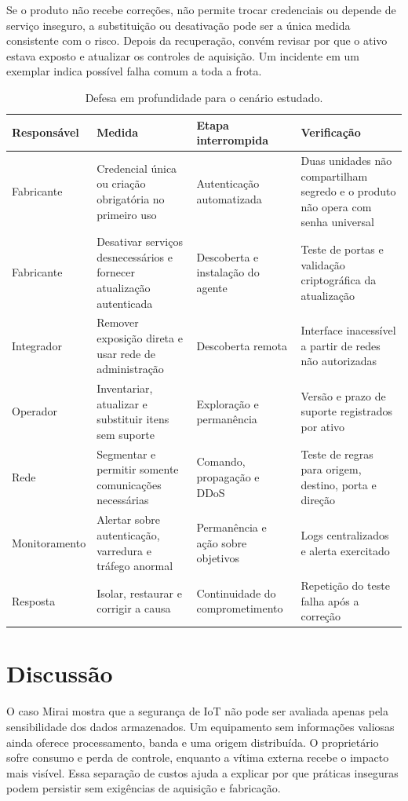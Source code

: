 \documentclass[11pt,a4paper]{article}
\begin{document}
Se o produto não recebe correções, não permite trocar credenciais ou depende de serviço inseguro, a substituição ou desativação pode ser a única medida consistente com o risco. Depois da recuperação, convém revisar por que o ativo estava exposto e atualizar os controles de aquisição. Um incidente em um exemplar indica possível falha comum a toda a frota.

\begin{table}[t]
\centering
\small
\caption{Defesa em profundidade para o cenário estudado.}
\label{tab:medidas}
\begin{tabularx}{\textwidth}{L{2.4cm}L{4.5cm}YY}
\toprule
Responsável & Medida & Etapa interrompida & Verificação \\
\midrule
Fabricante & Credencial única ou criação obrigatória no primeiro uso & Autenticação automatizada & Duas unidades não compartilham segredo e o produto não opera com senha universal \\
Fabricante & Desativar serviços desnecessários e fornecer atualização autenticada & Descoberta e instalação do agente & Teste de portas e validação criptográfica da atualização \\
Integrador & Remover exposição direta e usar rede de administração & Descoberta remota & Interface inacessível a partir de redes não autorizadas \\
Operador & Inventariar, atualizar e substituir itens sem suporte & Exploração e permanência & Versão e prazo de suporte registrados por ativo \\
Rede & Segmentar e permitir somente comunicações necessárias & Comando, propagação e DDoS & Teste de regras para origem, destino, porta e direção \\
Monitoramento & Alertar sobre autenticação, varredura e tráfego anormal & Permanência e ação sobre objetivos & Logs centralizados e alerta exercitado \\
Resposta & Isolar, restaurar e corrigir a causa & Continuidade do comprometimento & Repetição do teste falha após a correção \\
\bottomrule
\end{tabularx}
\end{table}

\section{Discussão}
O caso Mirai mostra que a segurança de IoT não pode ser avaliada apenas pela sensibilidade dos dados armazenados. Um equipamento sem informações valiosas ainda oferece processamento, banda e uma origem distribuída. O proprietário sofre consumo e perda de controle, enquanto a vítima externa recebe o impacto mais visível. Essa separação de custos ajuda a explicar por que práticas inseguras podem persistir sem exigências de aquisição e fabricação.
\end{document}
